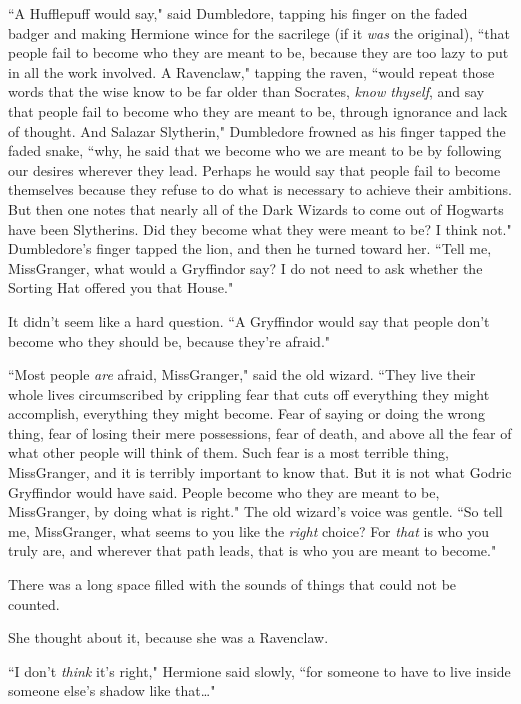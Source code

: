``A Hufflepuff would say," said Dumbledore, tapping his finger on the faded badger and making Hermione wince for the sacrilege (if it \emph{was} the original), ``that people fail to become who they are meant to be, because they are too lazy to put in all the work involved. A Ravenclaw," tapping the raven, ``would repeat those words that the wise know to be far older than Socrates, \emph{know thyself}, and say that people fail to become who they are meant to be, through ignorance and lack of thought. And Salazar Slytherin," Dumbledore frowned as his finger tapped the faded snake, ``why, he said that we become who we are meant to be by following our desires wherever they lead. Perhaps he would say that people fail to become themselves because they refuse to do what is necessary to achieve their ambitions. But then one notes that nearly all of the Dark Wizards to come out of Hogwarts have been Slytherins. Did they become what they were meant to be? I think not." Dumbledore's finger tapped the lion, and then he turned toward her. ``Tell me, Miss\?Granger, what would a Gryffindor say? I do not need to ask whether the Sorting Hat offered you that House."

It didn't seem like a hard question. ``A Gryffindor would say that people don't become who they should be, because they're afraid."

``Most people \emph{are} afraid, Miss\?Granger," said the old wizard. ``They live their whole lives circumscribed by crippling fear that cuts off everything they might accomplish, everything they might become. Fear of saying or doing the wrong thing, fear of losing their mere possessions, fear of death, and above all the fear of what other people will think of them. Such fear is a most terrible thing, Miss\?Granger, and it is terribly important to know that. But it is not what Godric Gryffindor would have said. People become who they are meant to be, Miss\?Granger, by doing what is right." The old wizard's voice was gentle. ``So tell me, Miss\?Granger, what seems to you like the \emph{right} choice? For \emph{that} is who you truly are, and wherever that path leads, that is who you are meant to become."

There was a long space filled with the sounds of things that could not be counted.

She thought about it, because she was a Ravenclaw.

``I don't \emph{think} it's right," Hermione said slowly, ``for someone to have to live inside someone else's shadow like that{\ldots}"

